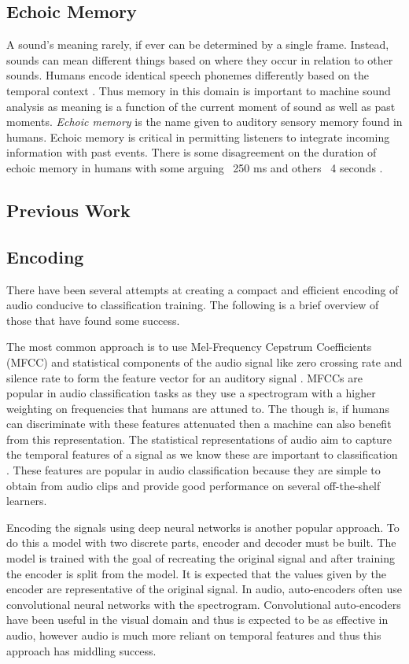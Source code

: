 \subsection{Echoic Memory}
A sound's meaning rarely, if ever can be determined by a single frame. Instead, sounds can mean different things based on where they occur in relation to other sounds. Humans encode identical speech phonemes differently based on the temporal context \cite{Eggermont2001}. Thus memory in this domain is important to machine sound analysis as meaning is a function of the current moment of sound as well as past moments. \textit{Echoic memory} is the name given to auditory sensory memory found in humans. Echoic memory is critical in permitting listeners to integrate incoming information with past events. There is some disagreement on the duration of echoic memory in humans with some arguing ~250 ms and others ~4 seconds \cite{Wingfield2016}.

\subsection{Previous Work}

\subsection{Encoding}
There have been several attempts at creating a compact and efficient encoding of audio conducive to classification training. The following is a brief overview of those that have found some success.

The most common approach is to use Mel-Frequency Cepstrum Coefficients (MFCC) and statistical components of the audio signal like zero crossing rate and silence rate to form the feature vector for an auditory signal \cite{Roma2010}. MFCCs are popular in audio classification tasks as they use a spectrogram with a higher weighting on frequencies that humans are attuned to. The though is, if humans can discriminate with these features attenuated then a machine can also benefit from this representation. The statistical representations of audio aim to capture the temporal features of a signal as we know these are important to classification \cite{slaney1993importance}. These features are popular in audio classification because they are simple to obtain from audio clips and provide good performance on several off-the-shelf learners.

Encoding the signals using deep neural networks is another popular approach. To do this a model with two discrete parts, encoder and decoder must be built. The model is trained with the goal of recreating the original signal and after training the encoder is split from the model. It is expected that the values given by the encoder are representative of the original signal. In audio, auto-encoders often use convolutional neural networks with the spectrogram. Convolutional auto-encoders have been useful in the visual domain and thus is expected to be as effective in audio, however audio is much more reliant on temporal features and thus this approach has middling success.

